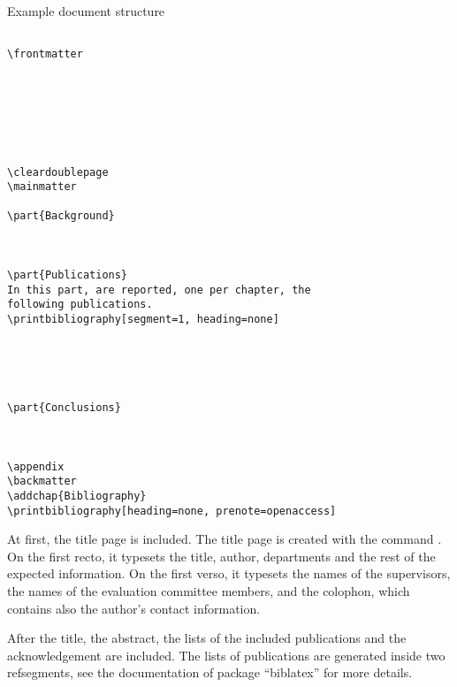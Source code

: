 \begin{listing}
\caption{Example document structure}
\label{lst:document-structure}
\centering
\begin{verbatim}

\frontmatter







\cleardoublepage
\mainmatter

\part{Background}



\part{Publications}
In this part, are reported, one per chapter, the
following publications.
\printbibliography[segment=1, heading=none]





\part{Conclusions}



\appendix
\backmatter
\addchap{Bibliography}
\printbibliography[heading=none, prenote=openaccess]

\end{verbatim}
\end{listing}

At first, the title page is included.
The title page is created with the command \texttt{\modernthesisfrontpage}.
On the first recto, it typesets the title, author, departments and the rest of the expected information.
On the first verso, it typesets the names of the supervisors, the names of the evaluation committee members, and the colophon, which contains also the author's contact information.

After the title, the abstract, the lists of the included publications and the acknowledgement are included.
The lists of publications are generated inside two refsegments, see the documentation of package \enquote{biblatex} for more details.

